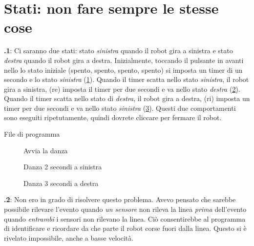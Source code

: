 \documentclass[12pt,a4paper,italian]{article}
\begin{document}
\section{Stati: non fare sempre le stesse cose}

\textbf{\thesection.1}:
Ci saranno due stati: stato \emph{sinistra}  quando il
robot gira a sinistra e stato \emph{destra}  quando
il robot gira a destra. Inizialmente, toccando il pulsante in avanti nello
lo stato iniziale (spento, spento, spento, spento) si imposta un timer di un secondo e lo stato
\emph{sinistra} (\cref{fig.dance-start}). Quando il timer scatta nello
stato \emph{sinistra}, il robot gira a sinistra, (re) imposta il timer per
due secondi e va nello stato \emph{destra}
(\cref{fig.dance-left}). Quando il timer scatta nello stato di
\emph{destra}, ​​il robot gira a destra, (ri) imposta un timer per due
secondi e va nello stato \emph{sinistra} (\cref{fig.dance-right}).
Questi due comportamenti sono eseguiti ripetutamente, quindi dovrete cliccare
 per fermare il robot.


{\raggedleft \hfill File di programma }


\begin{figure}
\begin{center}
\caption{Avvia la danza}\label{fig.dance-start}
\end{center}
\end{figure}

\begin{figure}
\begin{center}
\caption{Danza 2 secondi a sinistra}\label{fig.dance-left}
\end{center}
\end{figure}

\begin{figure}
\begin{center}
\caption{Danza 3 secondi a destra}\label{fig.dance-right}
\end{center}
\end{figure}

\textbf{\thesection.2}:
Non ero in grado di risolvere questo problema. Avevo pensato che sarebbe
possibile rilevare l'evento quando \emph{un sensore}  non rileva la
linea \emph{prima} dell'evento quando \emph{entrambi}  i sensori non rilevano
la linea. Ciò consentirebbe al programma di identificare e ricordare da
che parte il robot corse fuori dalla linea. Questo si è rivelato impossibile, anche a
basse velocità.
\end{document}
